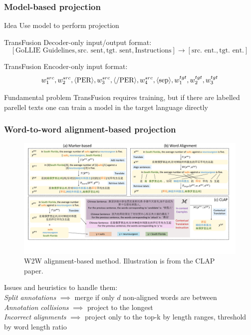 \documentclass{beamer}
\newcommand{\src}[1]{#1^{src}}
\newcommand{\tgt}[1]{#1^{tgt}}
\begin{document}
\begin{frame}
  \frametitle{Model-based projection}

  \begin{block}{Idea}
    Use model to perform projection
  \end{block}

  TransFusion Decoder-only input/output format:
  \[
    [\text{GoLLIE Guidelines}, \text{src. sent}, \text{tgt. sent}, \text{Instructions}]
    \stackrel{}{\rightarrow}
    [\text{src. ent.}, \text{tgt. ent.}]
  \]

  TransFusion Encoder-only input format:\\
  \[
    \src{w_1},
    \src{w_2},
    \text{\textlangle PER\textrangle},
    \src{w_3},
    \text{\textlangle/PER\textrangle},
    \src{w_4},
    \text{\textlangle sep\textrangle},
    \tgt{w_1},
    \tgt{w_2},
    \tgt{w_3}
  \]

  \begin{alertblock}{Fundamental problem}
    TransFusion requires training, but if there are labelled parellel texts one can train a model in
    the target language directly
  \end{alertblock}
\end{frame}

\begin{frame}
  \frametitle{Word-to-word alignment-based projection}
  \begin{figure}
    \includegraphics[height=0.4\textheight, clip, trim=24.5cm 10.7cm 0cm 1cm]{ClAP_marker_align.pdf}
    \caption{W2W alignment-based method. Illustration is from the CLAP paper.}
  \end{figure}

  \begin{flushleft}
    Issues and heuristics to handle them: \\
    \textit{Split annotations} \( \implies \) merge if only \( d \) non-aligned words are between \\
    \textit{Annotation collisions} \( \implies \) project to the longest \\
    \textit{Incorrect alignments} \( \implies \) project only to the top-k by length ranges, threshold by word length ratio
  \end{flushleft}
\end{frame}
\end{document}
